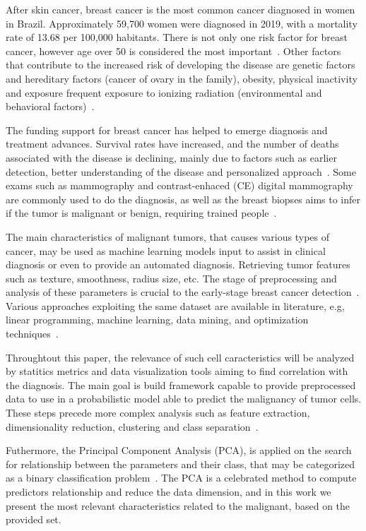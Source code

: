 \documentclass[conference]{IEEEtran}
\begin{document}
After skin cancer, breast cancer is the most common cancer diagnosed in women in Brazil. Approximately 59,700 women were diagnosed in 2019, with a mortality rate of 13.68 per 100,000 habitants. There is not only one risk factor for breast cancer, however age over 50 is considered the most important~\cite{INCA2019}. Other factors that contribute to the increased risk of developing the disease are genetic factors and hereditary factors (cancer of ovary in the family), obesity, physical inactivity and exposure frequent exposure to ionizing radiation (environmental and behavioral factors)~\cite{Bray2018, INCA2019}.

The funding support for breast cancer has helped to emerge diagnosis and treatment advances. Survival rates have increased, and the number of deaths associated with the disease is declining, mainly due to factors such as earlier detection, better understanding of the disease and personalized approach~\cite{Rivera2018}. Some exams such as mammography and contrast-enhaced (CE) digital mammography are commonly used to do the diagnosis, as well as the breast biopses aims to infer if the tumor is malignant or benign, requiring trained people~\cite{Sledge2014, Cardoso2014}.

The main characteristics of malignant tumors, that causes various types of cancer, may be used as machine learning models input to assist in clinical diagnosis or even to provide an automated diagnosis. Retrieving tumor features such as texture, smoothness, radius size, etc. The stage of preprocessing and analysis of these parameters is crucial to the early-stage breast cancer detection~\cite{Street1993}. Various approaches exploiting the same dataset are available in literature, e.g, linear programming, machine learning, data mining, and optimization techniques~\cite{Bennett1992, Wolberg1994, Mangasarian1995}.

Throughtout this paper, the relevance of such cell caracteristics will be analyzed by statitics metrics and data visualization tools 
aiming to find correlation with the diagnosis. The main goal is build framework capable to provide preprocessed data to use in a probabilistic model able to predict the malignancy of tumor cells. These steps precede more complex analysis such as feature extraction, dimensionality reduction, clustering and class separation~\cite{Hastie2009, Kuhn2013, James2013}.

Futhermore, the Principal Component Analysis (PCA), is applied on the search for relationship between the parameters and their class, that may be categorized as a binary classification problem~\cite{Abdi2010}. The PCA is a celebrated method to compute predictors relationship and reduce the data dimension, and in this work we present the most relevant characteristics related to the malignant, based on the provided set.
\end{document}
